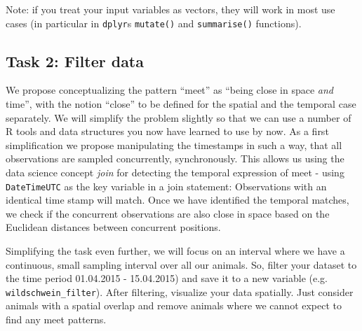 \documentclass[]{book}
\newenvironment{Shaded}{\begin{snugshade}}{\end{snugshade}}
\newcommand{\KeywordTok}[1]{\textcolor[rgb]{0.13,0.29,0.53}{\textbf{#1}}}
\newcommand{\DataTypeTok}[1]{\textcolor[rgb]{0.13,0.29,0.53}{#1}}
\newcommand{\FloatTok}[1]{\textcolor[rgb]{0.00,0.00,0.81}{#1}}
\newcommand{\StringTok}[1]{\textcolor[rgb]{0.31,0.60,0.02}{#1}}
\newcommand{\OperatorTok}[1]{\textcolor[rgb]{0.81,0.36,0.00}{\textbf{#1}}}
\newcommand{\NormalTok}[1]{#1}
\begin{document}
Note: if you treat your input variables as vectors, they will work in
most use cases (in particular in \texttt{dplyr}s \texttt{mutate()} and
\texttt{summarise()} functions).

\subsection{Task 2: Filter data}\label{task-2-filter-data}

We propose conceptualizing the pattern ``meet'' as ``being close in
space \emph{and} time'', with the notion ``close'' to be defined for the
spatial and the temporal case separately. We will simplify the problem
slightly so that we can use a number of R tools and data structures you
now have learned to use by now. As a first simplification we propose
manipulating the timestamps in such a way, that all observations are
sampled concurrently, synchronously. This allows us using the data
science concept \emph{join} for detecting the temporal expression of
meet - using \texttt{DateTimeUTC} as the key variable in a join
statement: Observations with an identical time stamp will match. Once we
have identified the temporal matches, we check if the concurrent
observations are also close in space based on the Euclidean distances
between concurrent positions.

Simplifying the task even further, we will focus on an interval where we
have a continuous, small sampling interval over all our animals. So,
filter your dataset to the time period 01.04.2015 - 15.04.2015) and save
it to a new variable (e.g. \texttt{wildschwein\_filter}). After
filtering, visualize your data spatially. Just consider animals with a
spatial overlap and remove animals where we cannot expect to find any
meet patterns.

\begin{Shaded}
\end{Shaded}
\end{document}
